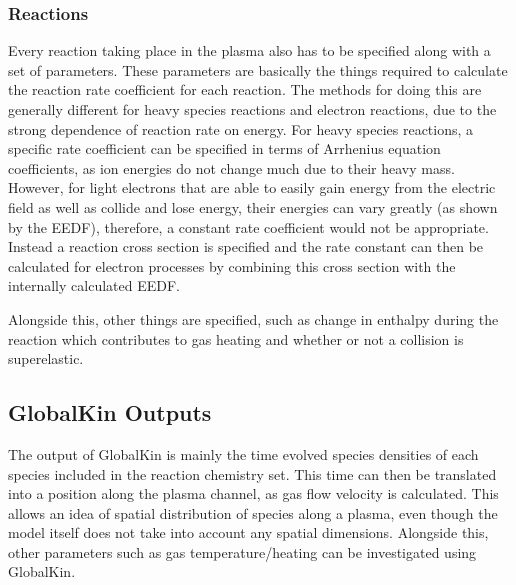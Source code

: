 \documentclass[11pt, oneside]{article}   	%
\begin{document}
\subsubsection*{Reactions}
Every reaction taking place in the plasma also has to be specified along with a set of parameters.
These parameters are basically the things required to calculate the reaction rate coefficient for each reaction.
The methods for doing this are generally different for heavy species reactions and electron reactions, due to the strong dependence of reaction rate on energy.
For heavy species reactions, a specific rate coefficient can be specified in terms of Arrhenius equation coefficients, as ion energies do not change much due to their heavy mass.
However, for light electrons that are able to easily gain energy from the electric field as well as collide and lose energy, their energies can vary greatly (as shown by the EEDF), therefore, a constant rate coefficient would not be appropriate. 
Instead a reaction cross section is specified and the rate constant can then be calculated for electron processes by combining this cross section with the internally calculated EEDF.

Alongside this, other things are specified, such as change in enthalpy during the reaction which contributes to gas heating and whether or not a collision is superelastic.


\subsection*{GlobalKin Outputs}
The output of GlobalKin is mainly the time evolved species densities of each species included in the reaction chemistry set.
This time can then be translated into a position along the plasma channel, as gas flow velocity is calculated.
This allows an idea of spatial distribution of species along a plasma, even though the model itself does not take into account any spatial dimensions. Alongside this, other parameters such as gas temperature/heating can be investigated using GlobalKin.
\end{document}
